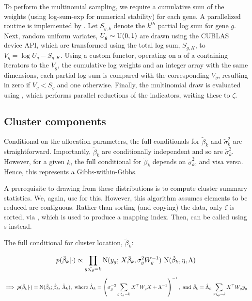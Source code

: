 To perform the multinomial sampling, we require a cumulative sum of the weights (using log-sum-exp for numerical stability) for each gene. A parallelized routine is implemented by . Let $S_{g,k}$ denote the $k^{th}$ partial log sum for gene $g$. Next, random uniform variates, $U_g \sim \operatorname{U}(0,1)$ are drawn using the CUBLAS device API, which are transformed using the total log sum, $S_{g,K}$, to $V_g = \log U_g - S_{g,K}$. Using a custom functor, operating on a  of a  containing iterators to the $V_g$, the cumulative log weights and an integer array with the same dimensions, each partial log sum is compared with the corresponding $V_g$, resulting in zero if $V_g<S_g$ and one otherwise. Finally, the multinomial draw is evaluated using , which performs parallel reductions of the indicators, writing these to $\zeta$.

\subsection{Cluster components}
Conditional on the allocation parameters, the full conditionals for $\tilde{\beta}_k$ and $\tilde{\sigma}^2_k$ are straightforward. Importantly, $\tilde{\beta}_k$ are conditionally independent and so are $\tilde{\sigma}^2_k$. However, for a given $k$, the full conditional for $\tilde{\beta}_k$ depends on $\tilde{\sigma}^2_k$, and visa versa. Hence, this represents a Gibbs-within-Gibbs.

A prerequisite to drawing from these distributions is to compute cluster summary statistics. We, again, use  for this. However, this algorithm assumes elements to be reduced are contiguous. Rather than sorting (and copying) the data, only $\zeta$ is sorted, via , which is used to produce a mapping index. Then,  can be called using s instead.

The full conditional for cluster location, $\tilde{\beta}_k$:

\begin{equation}
p(\tilde{\beta}_k|\cdot) \propto \prod_{g:\zeta_g=k} \operatorname{N}(y_g;\,X\tilde{\beta}_k, \sigma^2_gW^{-1}_g)\,\operatorname{N}(\tilde{\beta}_k, \eta, \Lambda)
\end{equation}
\begin{equation*}
\implies p(\tilde{\beta}_k|\cdot) = \operatorname{N}(\tilde{\beta}_k; \hat{\beta}_k,\, \hat{\Lambda}_k), \mbox{ where }\hat{\Lambda}_k= \left( \sigma^{-2}_g\sum_{g:\zeta_g=k} X^\top W_g X + \Lambda^{-1} \right)^{-1}, \mbox{ and }\hat{\beta}_k=\hat{\Lambda}_k \sum_{g:\zeta_g=k} X^\top W_g y_g
\end{equation*}

